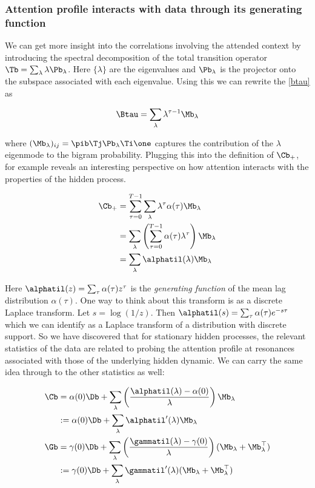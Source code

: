\documentclass{article}
\begin{document}
\subsubsection{Attention profile interacts with data through its generating function}
We can get more insight into the correlations involving the attended context by introducing the spectral decomposition of the total transition operator $\Tb = \sum_{\lambda} \lambda \Pb_{\lambda}$. Here $\{\lambda\}$ are the eigenvalues and $\Pb_\lambda$ is the projector onto the subspace associated with each eigenvalue. Using this we can rewrite the \eqref{btau} as 

\begin{equation}
    \Btau = \sum_\lambda \lambda^{\tau-1} \Mb_\lambda
\end{equation}

where $(\Mb_\lambda)_{ij}  = \pib \Tj \Pb_\lambda \Ti \one$ captures the contribution of the $\lambda$ eigenmode to the bigram probability. Plugging this into the definition of $\Cb_+$, for example reveals an interesting perspective on how attention interacts with the properties of the hidden process.

\begin{align}
    \Cb_+ &= \sum_{\tau=0}^{T-1} \sum_\lambda \lambda^\tau \alpha(\tau) \Mb_\lambda \\
    &= \sum_\lambda \left ( \sum_{\tau=0}^{T-1}  \alpha(\tau) \lambda^\tau  \right) \Mb_\lambda \\
    &= \sum_{\lambda} \alphatil(\lambda)\Mb_\lambda
\end{align}

Here $\alphatil(z) = \sum_{\tau}  \alpha(\tau) z^\tau $ is the \textit{generating function} of the mean lag distribution $\alpha(\tau)$. One way to think about this transform is as a discrete Laplace transform. Let $s = \log(1/z)$. Then $\alphatil(s) = \sum_{\tau}\alpha(\tau) e^{-s\tau} $ which we can identify as a Laplace transform of a distribution with discrete support. So we have discovered that for stationary hidden processes, the relevant statistics of the data are related to probing the attention profile at resonances associated with those of the underlying hidden dynamic. We can carry the same idea through to the other statistics as well:

\begin{align}
    \Cb &= \alpha(0)\Db + \sum_\lambda\left (\frac{\alphatil(\lambda) - \alpha(0)}{\lambda}\right) \Mb_\lambda \\
    &:= \alpha(0)\Db + \sum_\lambda \alphatil'(\lambda) \Mb_\lambda \\
    \Gb &= \gamma(0)\Db + \sum_\lambda\left (\frac{\gammatil(\lambda) - \gamma(0)}{\lambda}\right) (\Mb_\lambda + \Mb_\lambda^\top)\\
    &:= \gamma(0)\Db + \sum_\lambda\gammatil'(\lambda) (\Mb_\lambda + \Mb_\lambda^\top)
\end{align}
\end{document}
